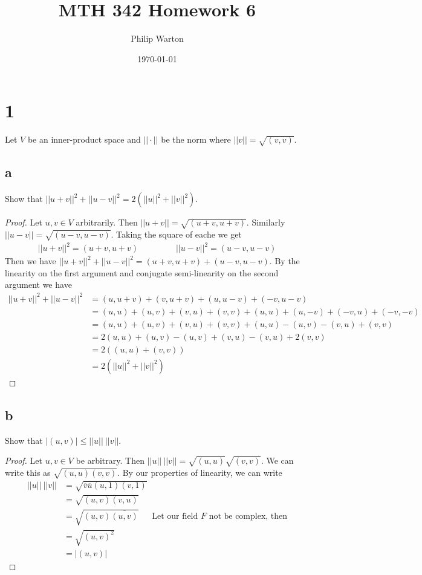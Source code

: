 \documentclass{article}
\begin{document}
\title{MTH 342 Homework 6}
\author{Philip Warton}
\date{\today}
\maketitle

\section*{1}
Let $V$ be an inner-product space and $||\cdot||$ be the norm where $||v|| = \sqrt{(v,v)}$.
\subsection*{a}
Show that $||u +v||^2 + ||u-v||^2 = 2(||u||^2+||v||^2)$.
\begin{proof}
Let $u, v \in V$ arbitrarily. Then $||u+v|| = \sqrt{(u+v,u+v)}$. Similarly $||u-v|| = \sqrt{(u-v,u-v)}$. Taking the square of eache we get 
\begin{align*}||u+v||^2 = (u+v, u+v) \ \ \ \   \ \ \ \ \ \ \ \ \ \ \ \ \ \ \ \ ||u-v||^2 = (u-v,u-v)\end{align*}
Then we have $||u+v||^2 + ||u-v||^2 = (u+v,u+v) + (u-v, u-v)$. By the linearity on the first argument and conjugate semi-linearity on the second argument we have 
\begin{align*} 
||u+v||^2 + ||u-v||^2 & = (u,u + v) + (v,u+v) + (u,u-v) + (-v, u-v) \\
&= (u,u) + (u,v) + (v,u) + (v,v) + (u,u) + (u, -v) + (-v,u) + (-v,-v) \\
& = (u,u) + (u,v) + (v,u) + (v,v) + (u,u) - (u,v) - (v,u) + (v,v) \\
&= 2(u,u) + (u,v) - (u,v) + (v,u) - (v,u) + 2(v,v)\\
&= 2((u,u) + (v,v)) \\
& = 2(||u||^2 + ||v||^2)
\end{align*}

\end{proof}
\subsection*{b}
Show that $|(u,v)| \leqslant ||u|| \ ||v||$.
\begin{proof}
Let $u,v \in V$ be arbitrary. Then $||u|| \ ||v|| = \sqrt{(u,u)}\sqrt{(v,v)}$. We can write this as $\sqrt{(u,u)(v,v)}$. By our properties of linearity, we can write 
\begin{align*}
||u|| \ ||v|| & = \sqrt{\overline{v}\overline{u}(u,1)(v,1)} \\
& = \sqrt{(u,v)(v,u)} \\
& = \sqrt{(u,v)\overline{(u,v)}} \ \ \ \ \ \ \ \text{Let our field $F$ not be complex, then} \\
& = \sqrt{(u,v)^2} \\
& = |(u,v)|
\end{align*}
\end{proof}
\end{document}
